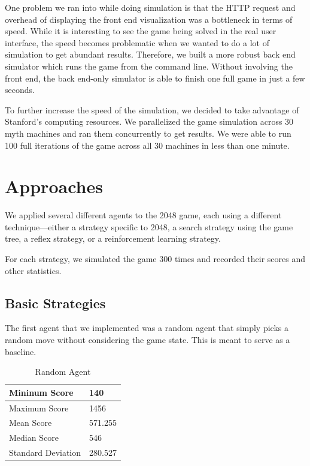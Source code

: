 \documentclass[9pt,twocolumn]{article}
\begin{document}
One problem we ran into while doing simulation is that the HTTP request and overhead of displaying the front end visualization was a bottleneck in terms of speed. While it is interesting to see the game being solved in the real user interface, the speed becomes problematic when we wanted to do a lot of simulation to get abundant results. Therefore, we built a more robust back end simulator which runs the game from the command line. Without involving the front end, the back end-only simulator is able to finish one full game in just a few seconds.

To further increase the speed of the simulation, we decided to take advantage of Stanford's computing resources. We parallelized the game simulation across 30 myth machines and ran them concurrently to get results. We were able to run 100 full iterations of the game across all 30 machines in less than one minute.

\section{Approaches}

We applied several different agents to the 2048 game, each using a different technique---either a strategy specific to 2048, a search strategy using the game tree, a reflex strategy, or a reinforcement learning strategy.

For each strategy, we simulated the game 300 times and recorded their scores and other statistics.

\subsection{Basic Strategies}

The first agent that we implemented was a random agent that simply picks a random move without considering the game state. This is meant to serve as a baseline.

\begin{table}[!htbp]

\centering

\begin{tabular}{|l|l|}
\hline
Mininum Score      & 140 \\ \hline
Maximum Score      & 1456 \\ \hline
Mean Score         & 571.255 \\ \hline
Median Score       & 546 \\ \hline
Standard Deviation & 280.527 \\ \hline
\end{tabular}

\caption{Random Agent}

\end{table}
\end{document}
